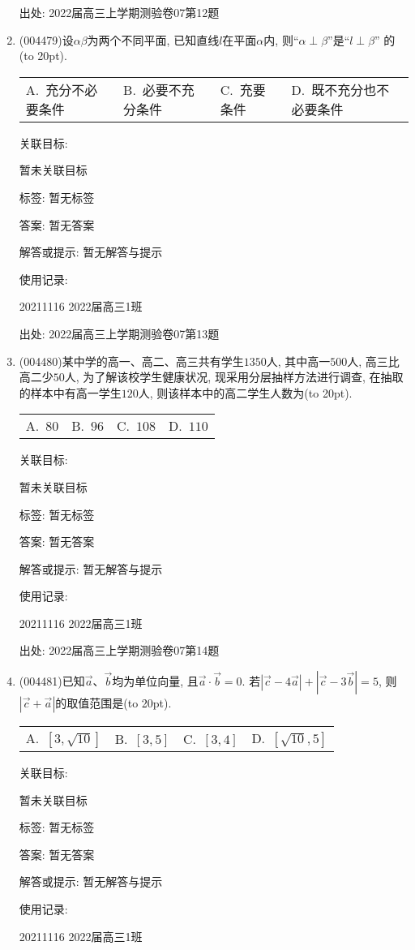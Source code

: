 \documentclass[10pt,a4paper]{article}
\newcommand{\bracket}[1]{(\hbox to #1pt{})}
\newcommand{\fourch}[4]{\par\begin{tabular}{p{.23\textwidth}p{.23\textwidth}p{.23\textwidth}p{.23\textwidth}}
A.~#1 &B.~#2& C.~#3& D.~#4
\end{tabular}}
\begin{document}
\begin{enumerate}[1.]
出处: 2022届高三上学期测验卷07第12题
\item { (004479)}设$\alpha \beta$为两个不同平面, 已知直线$l$在平面$\alpha$内, 则``$\alpha \perp \beta$''是``$l\perp \beta$''
的\bracket{20}.
\fourch{充分不必要条件}{必要不充分条件}{充要条件}{既不充分也不必要条件}


关联目标:

暂未关联目标



标签: 暂无标签

答案: 暂无答案

解答或提示: 暂无解答与提示

使用记录:

20211116	2022届高三1班	


出处: 2022届高三上学期测验卷07第13题
\item { (004480)}某中学的高一、高二、高三共有学生$1350$人, 其中高一$500$人, 高三比高二少$50$人, 为了解该校学生健康状况, 现采用分层抽样方法进行调查, 在抽取的样本中有高一学生$120$人, 则该样本中的高二学生人数为\bracket{20}.
\fourch{$80$}{$96$}{$108$}{$110$}


关联目标:

暂未关联目标



标签: 暂无标签

答案: 暂无答案

解答或提示: 暂无解答与提示

使用记录:

20211116	2022届高三1班	


出处: 2022届高三上学期测验卷07第14题
\item { (004481)}已知$\overrightarrow{a}$、$\overrightarrow b$均为单位向量, 且$\overrightarrow a\cdot\overrightarrow b=0$. 若$|\overrightarrow c-4\overrightarrow a |+| \overrightarrow c-3\overrightarrow b |=5$, 则$| \overrightarrow c+\overrightarrow a|$的取值范围是\bracket{20}.
\fourch{$[3,\sqrt{10}]$}{$[3,5]$}{$[3,4]$}{$[ \sqrt{10},5]$}


关联目标:

暂未关联目标



标签: 暂无标签

答案: 暂无答案

解答或提示: 暂无解答与提示

使用记录:

20211116	2022届高三1班	



\end{enumerate}
\end{document}
